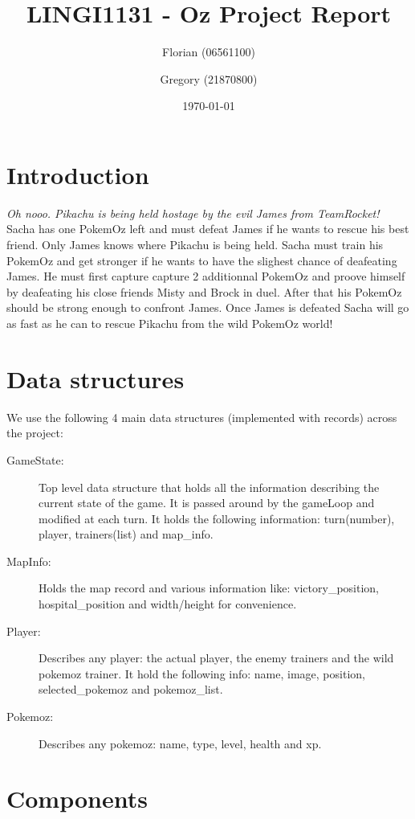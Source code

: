 \documentclass[10pt, a4paper]{article}
\author{Florian \bsc{Thuin} (06561100) \and Gregory \bsc{Vander Schueren} (21870800)}
\title{LINGI1131 - Oz Project Report}
\date{\today}
\begin{document}
\maketitle

\section*{Introduction}

\textit{Oh nooo. Pikachu is being held hostage by the evil James from TeamRocket!} Sacha has one PokemOz left and must defeat James if he wants to rescue his best friend. Only James knows where Pikachu is being held. Sacha must train his PokemOz and get stronger if he wants to have the slighest chance of deafeating James. He must first capture capture 2 additionnal PokemOz and proove himself by deafeating his close friends Misty and Brock in duel. After that his PokemOz should be strong enough to confront James. Once James is defeated Sacha will go as fast as he can to rescue Pikachu from the wild PokemOz world!

\section{Data structures}

We use the following 4 main data structures (implemented with records) across the project:

\begin{description}
  \item [GameState:] Top level data structure that holds all the information describing the current state of the game. It is passed around by the gameLoop and modified at each turn. It holds the following information: turn(number), player, trainers(list) and map\_info.
  \item [MapInfo:] Holds the map record and various information like: victory\_position, hospital\_position and width/height for convenience.
  \item [Player:] Describes any player: the actual player, the enemy trainers and the \og{}wild pokemoz\fg{} trainer. It hold the following info: name, image, position, selected\_pokemoz and pokemoz\_list.
  \item [Pokemoz:] Describes any pokemoz: name, type, level, health and xp.
\end{description}

\section{Components}
\end{document}
